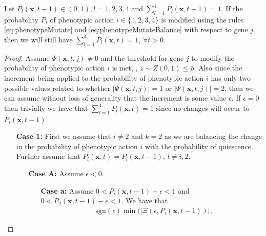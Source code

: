 \documentclass[\main/thesis.tex]{subfiles}
\begin{document}
\begin{lemma}
Let $P_l(\boldsymbol{x}, t{-}1) {\in} (0, 1), l {=} 1, 2, 3, 4$ and 
$\sum_{l{=}1}^4 P_l(\boldsymbol{x}, t{-}1) {=} 1$. If the probability $P_i$ of phenotypic action $i\in\{1,2,3,4\}$ is modified 
using the rules \eqref{eq:phenotypeMutate} and \eqref{eq:phenotypeMutateBalance} 
with respect to gene $j$ then we will still have $\sum_{l{=}1}^4 P_l(\boldsymbol{x}, t) {=} 1$, 
$\forall t {>} 0$.
\end{lemma}
\begin{proof}
	Assume $\Psi(\boldsymbol{x}, t, j) {\ne} 0$ and the threshold for gene $j$ to modify the probability of 
	phenotypic action $i$ is met, \ie, $z {\sim} Z(0, 1) {\le} \overline{\rho}$. Also since the increment 
	being applied to the probability of phenotypic action $i$ has only two possible values related to whether 
	$|\Psi(\boldsymbol{x}, t, j)| {=} 1$ or $|\Psi(\boldsymbol{x}, t, j)| {=} 2$, then we can assume without 
	loss of generality that the increment is some value $\epsilon$. If $\epsilon {=} 0$ then trivially we 
	have that $\sum_{l{=}1}^4 P_l(\boldsymbol{x}, t) {=} 1$ since no changes will occur to 
	$P_i(\boldsymbol{x}, t{-}1)$.
	\begin{itemize}
	  \item[{\bf Case 1:}] First we assume that $i {\ne} 2$ and $k {=} 2$ as we are balancing the change in 
	                       the probability of phenotypic action $i$ with the probability of quiescence.
	                       Further assume that $P_l(\boldsymbol{x}, t) {=} P_l(\boldsymbol{x}, t{-}1)$, 
	                       $l {\ne} i, 2$.
	                       \begin{itemize}
	                       	 \item[{\bf Case A:}] Assume $\epsilon {<} 0$.
                             \begin{itemize}
                           	   \item[{\bf Case a:}] Assume $0 {<} P_i(\boldsymbol{x}, t{-}1) {+} \epsilon {<} 1$ 
                           	                        and $0 {<} P_2(\boldsymbol{x}, t{-}1) {-} \epsilon {<} 1$. 
                           	                        We have that 
                           	                        \begin{align*}
                           	                          &\text{sgn}(\epsilon) 
                           	                           \min(|\Xi(\epsilon, 
                           	                                 P_i(\boldsymbol{x}, t{-}1))|, 

\end{align*}
\end{itemize}
\end{itemize}
\end{itemize}
\end{proof}
\end{document}
